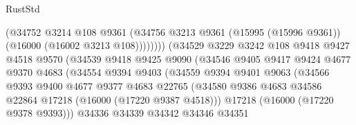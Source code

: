 \begin{lexlean}{RustStd}
\begin{coremodule}
                                      (@34752
                                        @3214
                                        @108
                                        @9361
                                        (@34756
                                          @3213
                                          @9361
                                          (@15995 (@15996 @9361))
                                          (@16000 (@16002 @3213 @108))))))))
                              (@34529
                                @3229
                                @3242
                                @108
                                @9418
                                @9427
                                @4518
                                @9570
                                (@34539
                                  @9418
                                  @9425
                                  @9090
                                  (@34546
                                    @9405
                                    @9417
                                    @9424
                                    @4677
                                    @9370
                                    @4683
                                    (@34554
                                      @9394
                                      @9403
                                      (@34559
                                        @9394
                                        @9401
                                        @9063
                                        (@34566
                                          @9393
                                          @9400
                                          @4677
                                          @9377
                                          @4683
                                          @22765
                                          (@34580
                                            @9386
                                            @4683
                                            @34586
                                            @22864
                                            @17218
                                            (@16000 (@17220 @9387 @4518)))
                                          @17218
                                          (@16000 (@17220 @9378 @9393)))
                                        @34336
                                        @34339
                                        @34342
                                        @34346
                                        @34351

\end{coremodule}
\end{lexlean}
